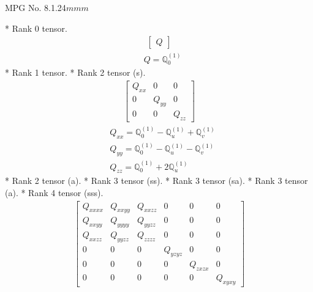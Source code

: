 \documentclass[fleqn,8pt,landscape]{jsarticle}
\begin{document}
\setcounter{MaxMatrixCols}{32}

\renewcommand{\tablename}{Table~}
\renewcommand{\figurename}{Figure~}
\begin{center}
\LARGE
MPG No. 8.1.24\quad$mmm$
\end{center}
* Rank 0 tensor.
\begin{align*}
\begin{bmatrix} Q \end{bmatrix}
\end{align*}
\begin{align*}
& Q = \mathbb{Q}_{0}^{(1)}
\end{align*}
* Rank 1 tensor.
* Rank 2 tensor (s).
\begin{align*}
\begin{bmatrix} Q_{xx} & 0 & 0 \\ 0 & Q_{yy} & 0 \\ 0 & 0 & Q_{zz} \end{bmatrix}
\end{align*}
\begin{align*}
& Q_{xx} = \mathbb{Q}_{0}^{(1)} - \mathbb{Q}_{u}^{(1)} + \mathbb{Q}_{v}^{(1)} \\
& Q_{yy} = \mathbb{Q}_{0}^{(1)} - \mathbb{Q}_{u}^{(1)} - \mathbb{Q}_{v}^{(1)} \\
& Q_{zz} = \mathbb{Q}_{0}^{(1)} + 2 \mathbb{Q}_{u}^{(1)}
\end{align*}
* Rank 2 tensor (a).
* Rank 3 tensor (ss).
* Rank 3 tensor (sa).
* Rank 3 tensor (a).
* Rank 4 tensor (sss).
\begin{align*}
\begin{bmatrix} Q_{xxxx} & Q_{xxyy} & Q_{xxzz} & 0 & 0 & 0 \\ Q_{xxyy} & Q_{yyyy} & Q_{yyzz} & 0 & 0 & 0 \\ Q_{xxzz} & Q_{yyzz} & Q_{zzzz} & 0 & 0 & 0 \\ 0 & 0 & 0 & Q_{yzyz} & 0 & 0 \\ 0 & 0 & 0 & 0 & Q_{zxzx} & 0 \\ 0 & 0 & 0 & 0 & 0 & Q_{xyxy} \end{bmatrix}
\end{align*}
\end{document}

